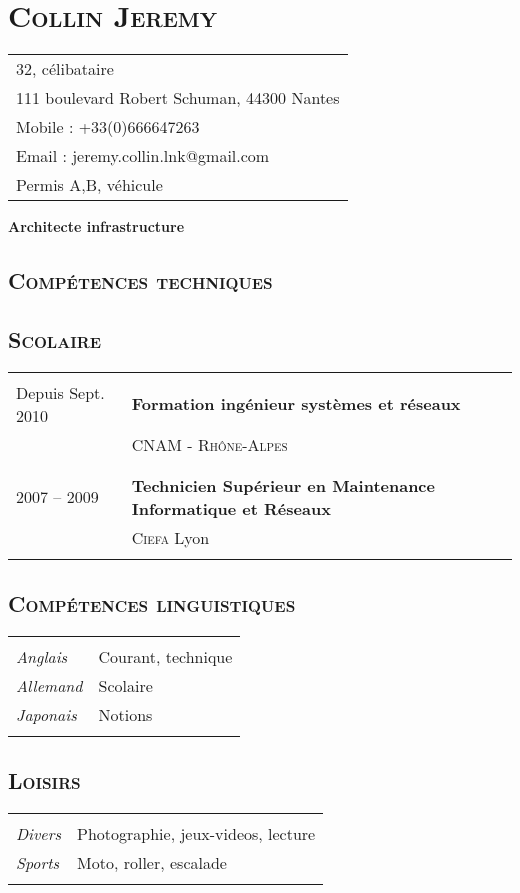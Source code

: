 \documentclass[a4paper,8pt]{article}
\newcommand{\hsection}[1]{\section*{\fontfamily{phv}\selectfont\textsc{#1}}}
\newcommand{\hsubsection}[1]{\subsection*{\fontfamily{phv}\selectfont\textsc{#1}}}
\begin{document}
\selectfont
\hsection{Collin Jeremy}
\begin{tabular}{p{16.5cm}}
\hline
32, célibataire\\
111 boulevard Robert Schuman, 44300 Nantes\\
Mobile : +33(0)666647263\\
Email : jeremy.collin.lnk@gmail.com\\
Permis A,B, véhicule\\
\end{tabular}
\begin{center}
\textbf{{\Large Architecte infrastructure}}
\end{center}
\hsubsection{Compétences techniques}

\newpage
\hsubsection{Scolaire}
\begin{tabular}{P{3.5cm}|p{13cm}}
 & \\
Depuis Sept. 2010		& \textbf{Formation ingénieur systèmes et réseaux}\\
				& \textsc{CNAM - Rhône-Alpes}\\
 & \\
 & \\
2007 -- 2009 			& \textbf{Technicien Supérieur en Maintenance Informatique et Réseaux}\\
				& \textsc{Ciefa} Lyon\\
 & \\
\end{tabular}

\hsubsection{Compétences linguistiques}
\begin{tabular}{P{3.5cm}|p{13cm}}
 & \\
\textsl{Anglais}		& Courant, technique\\
\textsl{Allemand}		& Scolaire\\
\textsl{Japonais}		& Notions\\
 & \\
\end{tabular}

\hsubsection{Loisirs}
\begin{tabular}{P{3.5cm}|p{13cm}}
 & \\
\textsl{Divers}			& Photographie, jeux-videos, lecture\\
\textsl{Sports}			& Moto, roller, escalade\\
 & \\
\end{tabular}
\end{document}
